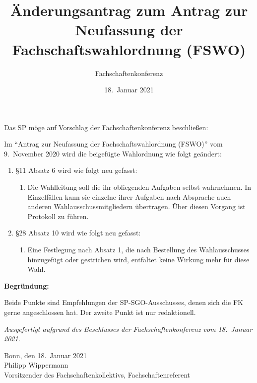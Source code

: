 \documentclass[DIV=12, parskip=half, fontsize=12pt, a4paper]{scrartcl}
\title{Änderungsantrag zum Antrag zur Neufassung der Fachschaftswahlordnung (FSWO)}
\author{Fachschaftenkonferenz}
\date{18.\ Januar 2021}
\begin{document}
  \maketitle
  Das SP möge auf Vorschlag der Fachschaftenkonferenz beschließen:

  \begin{linenumbers}
    Im \enquote{Antrag zur Neufassung der Fachschaftswahlordnung (FSWO)} vom 9.\ November 2020 wird die beigefügte Wahlordnung  wie folgt geändert:

    \begin{enumerate}[1.]
    	\item \S 11 Absatz 6 wird wie folgt neu gefasst:
    		\begin{enumerate}[(1)] \ttfamily
    		\setcounter{enumii}{5}
    		\item Die Wahlleitung soll die ihr obliegenden Aufgaben selbst wahrnehmen.
    			In Einzelfällen kann sie einzelne ihrer Aufgaben nach Absprache auch anderen Wahlausschussmitgliedern übertragen.
    		Über diesen Vorgang ist Protokoll zu führen.
    		\end{enumerate}
    	\item \S 28 Absatz 10 wird wie folgt neu gefasst:
    		\begin{enumerate}[(1)] \ttfamily
	    		\setcounter{enumii}{9}
	    		\item Eine Festlegung nach Absatz 1, die nach Bestellung des Wahlausschusses hinzugefügt oder gestrichen wird,
	    			entfaltet keine Wirkung mehr für diese Wahl.
	    	\end{enumerate}
    \end{enumerate}
  \end{linenumbers}

\vspace{1em}
\textbf{Begründung:}\par
Beide Punkte sind Empfehlungen der SP-SGO-Ausschusses, denen sich die FK gerne angeschlossen hat.
Der zweite Punkt ist nur redaktionell.

  \vspace{1em}
  \textit{Ausgefertigt aufgrund des Beschlusses der Fachschaftenkonferenz vom 18.\ Januar 2021.}

  Bonn, den 18.\ Januar 2021 \\
  Philipp Wippermann \\
  {\scriptsize Vorsitzender des Fachschaftenkollektivs, Fachschaftenreferent}

%  
\end{document}
